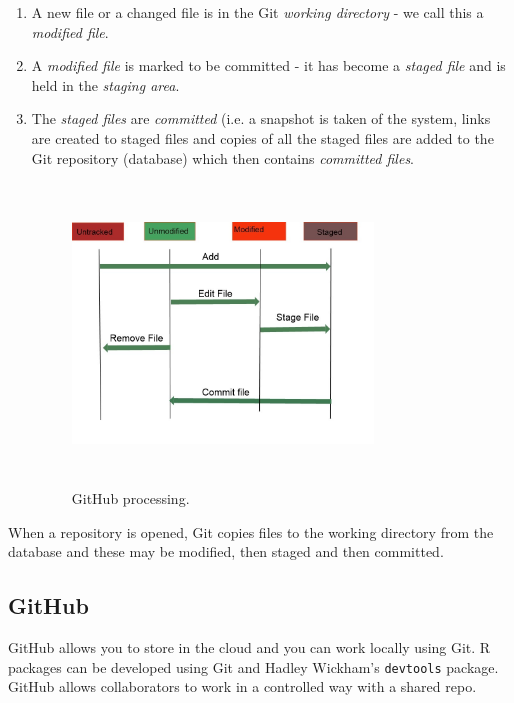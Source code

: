 \documentclass[titlepage]{book}\usepackage{knitr}
\begin{document}
\begin{enumerate}
\item{ A new file or a changed file is in the Git \emph{working directory} - we call this a \emph{modified file}.}
\item{A \emph{modified file} is marked to be committed - it has become a \emph{staged file} and is held in the \emph{staging area}.}
\item{The \emph{staged files} are \emph{committed} (i.e. a snapshot is taken of the system, links are created to staged files and copies of all the staged files are added to the Git repository (database) which then contains \emph{committed files}. }

\begin{figure}[!ht]
\graphicspath{{./images/}}
\includegraphics[width=8cm, height = 8cm]{GitHub2.jpg}
\caption{GitHub processing.}
\label{fig:pch}
\end{figure}

\end{enumerate}

When a repository is opened, Git copies files to the working directory from the database and these may be modified, then staged and then committed.

\subsection{GitHub}

GitHub allows you to store in the cloud and you can work locally using Git.  R packages can be developed using Git and Hadley Wickham's \texttt{devtools} package.  GitHub allows collaborators to work in a controlled way with a shared repo.
\end{document}
